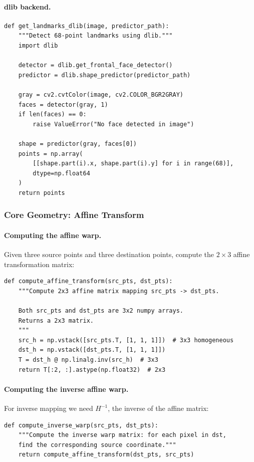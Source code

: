 \paragraph{dlib backend.}

\begin{verbatim}
def get_landmarks_dlib(image, predictor_path):
    """Detect 68-point landmarks using dlib."""
    import dlib

    detector = dlib.get_frontal_face_detector()
    predictor = dlib.shape_predictor(predictor_path)

    gray = cv2.cvtColor(image, cv2.COLOR_BGR2GRAY)
    faces = detector(gray, 1)
    if len(faces) == 0:
        raise ValueError("No face detected in image")

    shape = predictor(gray, faces[0])
    points = np.array(
        [[shape.part(i).x, shape.part(i).y] for i in range(68)],
        dtype=np.float64
    )
    return points
\end{verbatim}

\subsubsection*{Core Geometry: Affine Transform}

\paragraph{Computing the affine warp.}
Given three source points and three destination points, compute the $2 \times 3$ affine transformation matrix:

\begin{verbatim}
def compute_affine_transform(src_pts, dst_pts):
    """Compute 2x3 affine matrix mapping src_pts -> dst_pts.

    Both src_pts and dst_pts are 3x2 numpy arrays.
    Returns a 2x3 matrix.
    """
    src_h = np.vstack([src_pts.T, [1, 1, 1]])  # 3x3 homogeneous
    dst_h = np.vstack([dst_pts.T, [1, 1, 1]])
    T = dst_h @ np.linalg.inv(src_h)  # 3x3
    return T[:2, :].astype(np.float32)  # 2x3
\end{verbatim}

\paragraph{Computing the inverse affine warp.}
For inverse mapping we need $H^{-1}$, the inverse of the affine matrix:

\begin{verbatim}
def compute_inverse_warp(src_pts, dst_pts):
    """Compute the inverse warp matrix: for each pixel in dst,
    find the corresponding source coordinate."""
    return compute_affine_transform(dst_pts, src_pts)
\end{verbatim}

